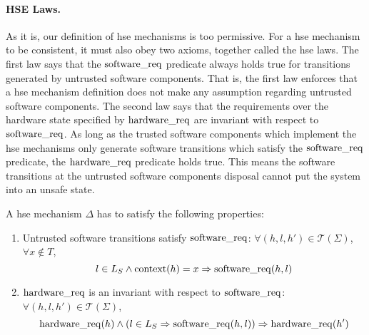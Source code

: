 \paragraph{HSE Laws.}
%
As it is, our definition of \ac{hse} mechanisms is too permissive.
%
For a \ac{hse} mechanism to be consistent, it must also obey two axioms,
together called the \ac{hse} laws.
%
The first law says that the $\mathrm{software\_req}$ predicate always holds true
for transitions generated by untrusted software components.
%
That is, the first law enforces that a \ac{hse} mechanism definition does not
make any assumption regarding untrusted software components.
%
The second law says that the requirements over the hardware state specified by
$\mathrm{hardware\_req}$ are invariant with respect to $\mathrm{software\_req}$.
%
As long as the trusted software components which implement the \ac{hse}
mechanisms only generate software transitions which satisfy the
$\mathrm{software\_req}$ predicate, the $\mathrm{hardware\_req}$ predicate holds
true.
%
This means the software transitions at the untrusted software components
disposal cannot put the system into an unsafe state.

\begin{definition}
  \label{def:speccert:laws}
  A \ac{hse} mechanism $\Delta$ has to satisfy the following properties:
  \begin{enumerate}
  \item Untrusted software transitions satisfy $\mathrm{software\_req}$:
    $\forall (h, l, h') \in \mathcal{T}(\Sigma)$, $\forall x \not\in T$,
    \[
      l \in L_S \wedge \mathrm{context}(h) = x \Rightarrow \mathrm{software\_req}(h,
      l)
    \]
  \item $\mathrm{hardware\_req}$ is an invariant with respect to
    $\mathrm{software\_req}$: $\forall (h, l, h') \in \mathcal{T}(\Sigma)$,
    \[
      \mathrm{hardware\_req}(h) \wedge (l \in L_S \Rightarrow
      \mathrm{software\_req}(h,l)) \Rightarrow \mathrm{hardware\_req}(h')
    \]
  \end{enumerate}
\end{definition}

